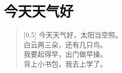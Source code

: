 \documentclass[12pt,UTF-8,openany]{ctexbook}
\begin{document}
\clearpage

\begin{center}
    
\end{center}


\hanzibox{}\hanzibox{}\hanzibox{}\hanzibox{}\hspace{1em}\hanzibox{}\hanzibox{}\hanzibox{}\hanzibox{}

\hanzibox{}\hanzibox{}\hanzibox{}\hanzibox{}\hspace{1em}\hanzibox{}\hanzibox{}\hanzibox{}\hanzibox{}

\hanzibox{}\hanzibox{}\hanzibox{}\hanzibox{}\hspace{1em}\hanzibox{}\hanzibox{}\hanzibox{}\hanzibox{}






\chapter{今天天气好}

\begin{large}
    
    \begin{verse}[0.5\linewidth]
        今天天气好，太阳当空照。 \\
        白云两三朵，还有几只鸟。 \\
        我要起得早，出门做早操。 \\
        背上小书包，我去上学了。
    \end{verse}
    
\end{large}


\clearpage

\begin{center}
    
\end{center}


\hanzibox{}\hanzibox{}\hanzibox{}\hanzibox{}\hspace{1em}\hanzibox{}\hanzibox{}\hanzibox{}\hanzibox{}

\hanzibox{}\hanzibox{}\hanzibox{}\hanzibox{}\hspace{1em}\hanzibox{}\hanzibox{}\hanzibox{}\hanzibox{}
\end{document}
